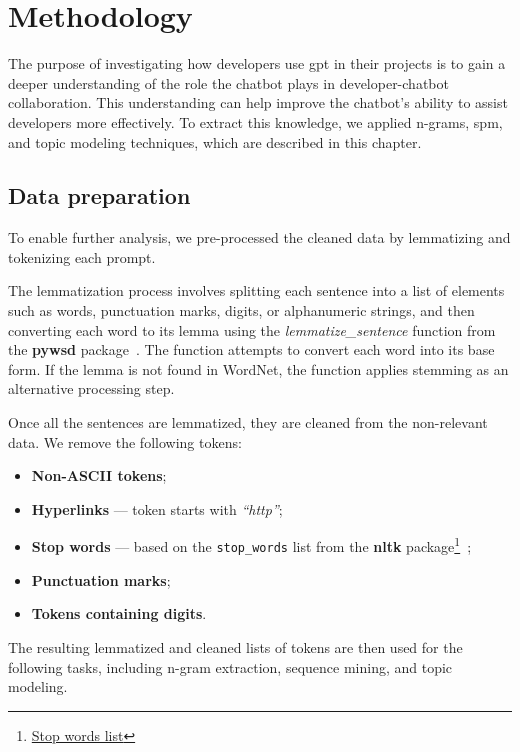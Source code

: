 \chapter{Methodology}\label{methodology}
The purpose of investigating how developers use \acrshort{gpt} in their projects is to gain a deeper understanding of the role the chatbot plays in developer-chatbot collaboration. This understanding can help improve the chatbot's ability to assist developers more effectively. To extract this knowledge, we applied n-grams, \acrfull{spm}, and topic modeling techniques, which are described in this chapter.

\section{Data preparation}\label{sec:data-prep}
To enable further analysis, we pre-processed the cleaned data by lemmatizing and tokenizing each prompt.  

The lemmatization process involves splitting each sentence into a list of elements such as words, punctuation marks, digits, or alphanumeric strings, and then converting each word to its lemma using the \textit{lemmatize\_sentence} function from the \textbf{pywsd} package~\cite{pywsd14}. The function attempts to convert each word into its base form. If the lemma is not found in WordNet, the function applies stemming as an alternative processing step.

Once all the sentences are lemmatized, they are cleaned from the non-relevant data. We remove the following tokens: 
\begin{itemize}
    \item \textbf{Non-ASCII tokens};
    \item \textbf{Hyperlinks} --- token starts with \textit{``http''};
    \item \textbf{Stop words} --- based on the \texttt{stop\_words} list from the \textbf{nltk} package\footnote{\href{https://www.geeksforgeeks.org/removing-stop-words-nltk-python/}{Stop words list}}~\cite{nltk};
    \item \textbf{Punctuation marks}; 
    \item \textbf{Tokens containing digits}.
\end{itemize}

The resulting lemmatized and cleaned lists of tokens are then used for the following tasks, including n-gram extraction, sequence mining, and topic modeling.


